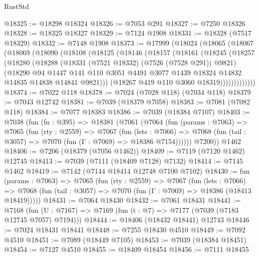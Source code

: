 \begin{lexlean}{RustStd}
\begin{coremodule}
@18325 := @18298 @18324
@18326 := @7053 @291
@18327 := @7250 @18326
@18328 := @18325 @18327
@18329 := @7124 @1908
@18331 := @18328 (@7517 @18329)
@18332 := @7148 @1908
@18373 := @17999
    (@18024
      (@18065
        (@18067
          (@18069
            (@18090
              (@18108
                (@18125
                  (@18146
                    (@18157
                      (@18161
                        (@18245
                          (@18257
                            (@18280
                              (@18288
                                (@18331 (@7521 @18332) (@7526 (@7528 @291)) @9821)
                                (@18290
                                  @94
                                  @1447
                                  @141
                                  @110
                                  @3051
                                  @4491
                                  @3077
                                  @1439
                                  @18324
                                  @14832
                                  @14835
                                  @14838
                                  @14841
                                  @9821)))
                            (@18267 @419 @110 @3060 @18319)))))))))))))
@18374 := @7022 @118
@18378 := @7024 (@7028 @118) (@7034 @118)
@18379 := @7043 @12742
@18381 := @7039 (@18379 @7058)
@18383 := @7081 (@7082 @118)
@18384 := @7077 @18383
@18386 := @7039 (@18384 @7107)
@18403 := @7038
    (fun (fn : @395) =>
    @18381
      (@7061
        (@7064
          (fun (params : @7063) =>
          @7065
            (fun (rty : @2559) =>
            @7067
              (fun (lets : @7066) =>
              @7068 (fun (tail : @3057) => @7070 (fun (Γ : @7069) => @18386 @7154))))))
        @7200))
    @1462
@18406 := @7206 (@18379 (@7056 @1462))
@18409 := @7119 (@7120 @1462) @12745
@18413 := @7039 (@7111 (@18409 @7128) @7132)
@18414 := @7145 @1462
@18419 := @7142 (@7144 @18414 @12748 @7100 @7102)
@18430 := fun (params : @7063) =>
  @7065
    (fun (rty : @2559) =>
    @7067
      (fun (lets : @7066) =>
      @7068 (fun (tail : @3057) => @7070 (fun (Γ : @7069) => @18386 (@18413 @18419)))))
@18431 := @7064 @18430
@18432 := @7061 @18431
@18441 := @7168
    (fun (U : @7167) => @7169 (fun (t : @7) => @7177 (@7039 (@7183 @12745 @7057) @7194)))
@18444 := @18406 (@18432 @18441) @12743
@18446 := @7024 @18431 @18441
@18448 := @7255 @18430 @4510
@18449 := @7092 @4510
@18451 := @7089 (@18449 @7105)
@18453 := @7039 (@18384 @18451)
@18454 := @7127 @4510
@18455 := @18409 @18454
@18456 := @7111 @18455

\end{coremodule}
\end{lexlean}
